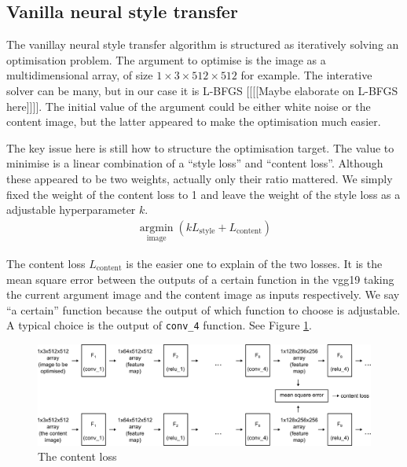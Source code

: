 \documentclass[runningheads]{llncs}
\DeclareMathOperator*{\argmin}{argmin}
\begin{document}
\subsection{Vanilla neural style transfer}

The vanillay neural style transfer algorithm \cite{nst} is 
structured as iteratively solving an optimisation problem.
The argument to optimise is the image as a multidimensional array,
of size $1\times3\times512\times512$ for example.
The interative solver can be many, but in our case it is 
L-BFGS [[[[Maybe elaborate on L-BFGS here]]]]. 
The initial value of the argument could be either white noise or the content image,
but the latter appeared to make the optimisation much easier.

The key issue here is still how to structure the optimisation target.
The value to minimise is a linear combination of a ``style loss'' 
and ``content loss''.
Although these appeared to be two weights,
actually only their ratio mattered.
We simply fixed the weight of the content loss to 1 and
leave the weight of the style loss as a adjustable hyperparameter $k$.
\begin{align}
\argmin\limits_{\text{image}} (kL_\text{style}+L_\text{content})
\end{align}

The content loss $L_\text{content}$ is the easier one to explain of the two losses.
It is the mean square error between the outputs of a certain function in the
vgg19 taking the current argument image and the content image as inputs respectively.
We say ``a certain'' function because the output of which function to choose is
adjustable.
A typical choice is the output of \verb|conv_4| function. See Figure \ref{contentloss}.
\begin{figure}
\center
\includegraphics[width=\textwidth]{contentloss.pdf}
\caption{The content loss \label{contentloss}}
\end{figure}
\end{document}
